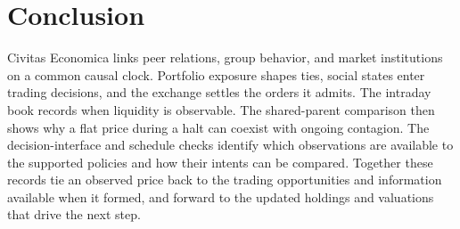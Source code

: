 \section{Conclusion}
\label{sec:conclusion}

Civitas Economica links peer relations, group behavior, and market institutions on a common causal clock. Portfolio exposure shapes ties, social states enter trading decisions, and the exchange settles the orders it admits. The intraday book records when liquidity is observable. The shared-parent comparison then shows why a flat price during a halt can coexist with ongoing contagion. The decision-interface and schedule checks identify which observations are available to the supported policies and how their intents can be compared. Together these records tie an observed price back to the trading opportunities and information available when it formed, and forward to the updated holdings and valuations that drive the next step.
